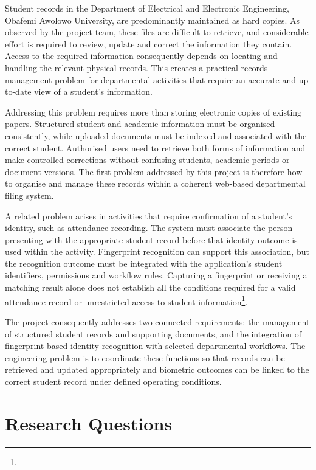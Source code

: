 Student records in the Department of Electrical and Electronic Engineering, Obafemi Awolowo University, are predominantly maintained as hard copies. As observed by the project team, these files are difficult to retrieve, and considerable effort is required to review, update and correct the information they contain. Access to the required information consequently depends on locating and handling the relevant physical records. This creates a practical records-management problem for departmental activities that require an accurate and up-to-date view of a student's information.

Addressing this problem requires more than storing electronic copies of existing papers. Structured student and academic information must be organised consistently, while uploaded documents must be indexed and associated with the correct student. Authorised users need to retrieve both forms of information and make controlled corrections without confusing students, academic periods or document versions. The first problem addressed by this project is therefore how to organise and manage these records within a coherent web-based departmental filing system.

A related problem arises in activities that require confirmation of a student's identity, such as attendance recording. The system must associate the person presenting with the appropriate student record before that identity outcome is used within the activity. Fingerprint recognition can support this association, but the recognition outcome must be integrated with the application's student identifiers, permissions and workflow rules. Capturing a fingerprint or receiving a matching result alone does not establish all the conditions required for a valid attendance record or unrestricted access to student information\footnote{}.

The project consequently addresses two connected requirements: the management of structured student records and supporting documents, and the integration of fingerprint-based identity recognition with selected departmental workflows. The engineering problem is to coordinate these functions so that records can be retrieved and updated appropriately and biometric outcomes can be linked to the correct student record under defined operating conditions.

\section{Research Questions}\label{sec:1-3}

